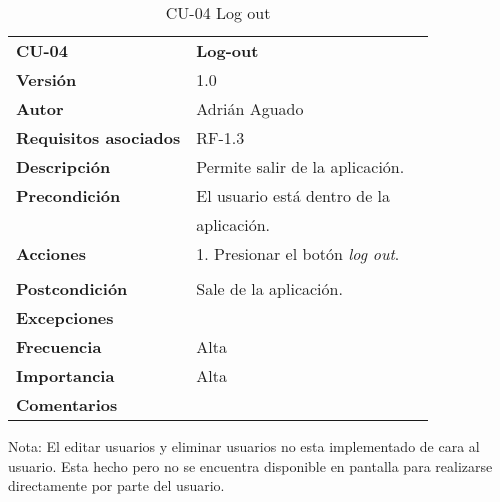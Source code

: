 \begin{table}
\begin{tabular}{llr}  
\toprule
\begin{minipage}[b]{0.24\columnwidth}\raggedright\strut
\textbf{CU-04}\strut
\end{minipage} & \begin{minipage}[b]{0.72\columnwidth}\raggedright\strut
\textbf{Log-out}\strut
\end{minipage}\tabularnewline
\cmidrule(r){1-2}
\textbf{Versión}       & 1.0           \\
\textbf{Autor}       & Adrián  Aguado    \\
\textbf{Requisitos asociados}       & RF-1.3 \\ 
\textbf{Descripción} & Permite salir de la aplicación.\\
\textbf{Precondición} & El usuario está dentro de la \\
& aplicación.       \\
\textbf{Acciones} & 1. Presionar el botón \emph{log out}.\\
   \\
\textbf{Postcondición} & Sale de la aplicación.  \\
\textbf{Excepciones} &     \\
\textbf{Frecuencia} & Alta            \\
\textbf{Importancia} & Alta            \\
\textbf{Comentarios } &      \\
\bottomrule
\end{tabular}
\caption{CU-04 Log out} 
\end{table}

Nota: El editar usuarios y eliminar usuarios no esta implementado de cara al usuario. Esta hecho pero no se encuentra disponible en pantalla para realizarse directamente por parte del usuario.

